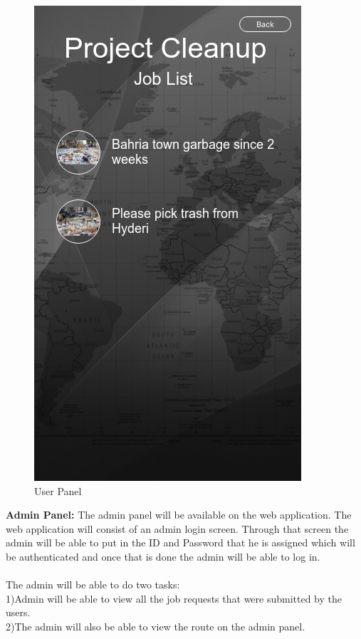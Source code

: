 \newpage
\begin{figure}[!hb]
   \centering

   \includegraphics[scale=0.5]{images/5.png}
 
   
 
   \caption{User Panel}\label{fig:picture}
\end{figure}

\textbf{Admin Panel:}
The admin panel will be available on the web application. The web application will consist of an admin login screen. Through that screen the admin will be able to put in the ID and Password that he is assigned which will be authenticated and once that is done the admin will be able to log in.\\
\\
The admin will be able to do two tasks:\\
1)Admin will be able to view all the job requests that were submitted by the users.\\
2)The admin will also be able to view the route on the admin panel.

